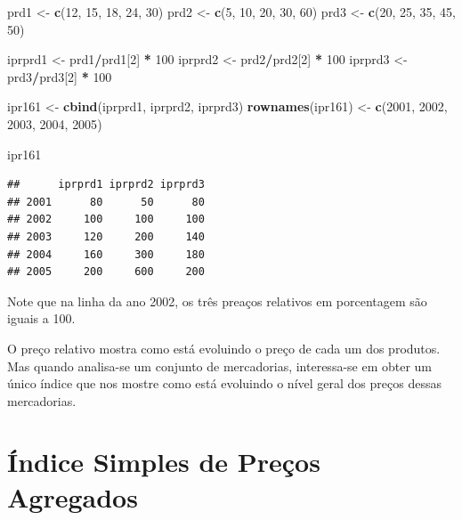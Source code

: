 \documentclass[
]{book}
\newenvironment{Shaded}{\begin{snugshade}}{\end{snugshade}}
\newcommand{\DecValTok}[1]{\textcolor[rgb]{0.00,0.00,0.81}{#1}}
\newcommand{\KeywordTok}[1]{\textcolor[rgb]{0.13,0.29,0.53}{\textbf{#1}}}
\newcommand{\NormalTok}[1]{#1}
\newcommand{\OperatorTok}[1]{\textcolor[rgb]{0.81,0.36,0.00}{\textbf{#1}}}
\newcommand{\StringTok}[1]{\textcolor[rgb]{0.31,0.60,0.02}{#1}}
\begin{document}
\begin{Shaded}
\begin{Highlighting}[]
\NormalTok{prd1 <-}\StringTok{ }\KeywordTok{c}\NormalTok{(}\DecValTok{12}\NormalTok{, }\DecValTok{15}\NormalTok{, }\DecValTok{18}\NormalTok{, }\DecValTok{24}\NormalTok{, }\DecValTok{30}\NormalTok{)}
\NormalTok{prd2 <-}\StringTok{ }\KeywordTok{c}\NormalTok{(}\DecValTok{5}\NormalTok{, }\DecValTok{10}\NormalTok{, }\DecValTok{20}\NormalTok{, }\DecValTok{30}\NormalTok{, }\DecValTok{60}\NormalTok{)}
\NormalTok{prd3 <-}\StringTok{ }\KeywordTok{c}\NormalTok{(}\DecValTok{20}\NormalTok{, }\DecValTok{25}\NormalTok{, }\DecValTok{35}\NormalTok{, }\DecValTok{45}\NormalTok{, }\DecValTok{50}\NormalTok{)}

\NormalTok{iprprd1 <-}\StringTok{ }\NormalTok{prd1}\OperatorTok{/}\NormalTok{prd1[}\DecValTok{2}\NormalTok{] }\OperatorTok{*}\StringTok{ }\DecValTok{100}
\NormalTok{iprprd2 <-}\StringTok{ }\NormalTok{prd2}\OperatorTok{/}\NormalTok{prd2[}\DecValTok{2}\NormalTok{] }\OperatorTok{*}\StringTok{ }\DecValTok{100}
\NormalTok{iprprd3 <-}\StringTok{ }\NormalTok{prd3}\OperatorTok{/}\NormalTok{prd3[}\DecValTok{2}\NormalTok{] }\OperatorTok{*}\StringTok{ }\DecValTok{100}

\NormalTok{ipr161 <-}\StringTok{ }\KeywordTok{cbind}\NormalTok{(iprprd1, iprprd2, iprprd3)}
\KeywordTok{rownames}\NormalTok{(ipr161) <-}\StringTok{ }\KeywordTok{c}\NormalTok{(}\DecValTok{2001}\NormalTok{, }\DecValTok{2002}\NormalTok{, }\DecValTok{2003}\NormalTok{, }\DecValTok{2004}\NormalTok{, }\DecValTok{2005}\NormalTok{)}

\NormalTok{ipr161}
\end{Highlighting}
\end{Shaded}

\begin{verbatim}
##      iprprd1 iprprd2 iprprd3
## 2001      80      50      80
## 2002     100     100     100
## 2003     120     200     140
## 2004     160     300     180
## 2005     200     600     200
\end{verbatim}

Note que na linha da ano 2002, os três preaços relativos em porcentagem são iguais a 100.

O preço relativo mostra como está evoluindo o preço de cada um dos produtos. Mas quando analisa-se um conjunto de mercadorias, interessa-se em obter um único índice que nos mostre como está evoluindo o nível geral dos preços dessas mercadorias.

\hypertarget{uxedndice-simples-de-preuxe7os-agregados}{%
\section{Índice Simples de Preços Agregados}\label{uxedndice-simples-de-preuxe7os-agregados}}
\end{document}
